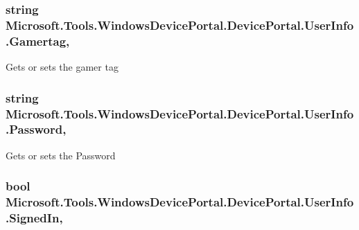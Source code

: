 \subsubsection[{\texorpdfstring{Gamertag}{Gamertag}}]{\setlength{\rightskip}{0pt plus 5cm}string Microsoft.\+Tools.\+Windows\+Device\+Portal.\+Device\+Portal.\+User\+Info.\+Gamertag\hspace{0.3cm}{\ttfamily [get]}, {\ttfamily [set]}}\hypertarget{class_microsoft_1_1_tools_1_1_windows_device_portal_1_1_device_portal_1_1_user_info_ad53d01d610b2f192296449ae0192ad94}{}\label{class_microsoft_1_1_tools_1_1_windows_device_portal_1_1_device_portal_1_1_user_info_ad53d01d610b2f192296449ae0192ad94}


Gets or sets the gamer tag 

\subsubsection[{\texorpdfstring{Password}{Password}}]{\setlength{\rightskip}{0pt plus 5cm}string Microsoft.\+Tools.\+Windows\+Device\+Portal.\+Device\+Portal.\+User\+Info.\+Password\hspace{0.3cm}{\ttfamily [get]}, {\ttfamily [set]}}\hypertarget{class_microsoft_1_1_tools_1_1_windows_device_portal_1_1_device_portal_1_1_user_info_a9211fecccaea4624abad5af1764dafeb}{}\label{class_microsoft_1_1_tools_1_1_windows_device_portal_1_1_device_portal_1_1_user_info_a9211fecccaea4624abad5af1764dafeb}


Gets or sets the Password 

\subsubsection[{\texorpdfstring{Signed\+In}{SignedIn}}]{\setlength{\rightskip}{0pt plus 5cm}bool Microsoft.\+Tools.\+Windows\+Device\+Portal.\+Device\+Portal.\+User\+Info.\+Signed\+In\hspace{0.3cm}{\ttfamily [get]}, {\ttfamily [set]}}\hypertarget{class_microsoft_1_1_tools_1_1_windows_device_portal_1_1_device_portal_1_1_user_info_abfc08ec51962a43b1e8566a93402d5e8}{}\label{class_microsoft_1_1_tools_1_1_windows_device_portal_1_1_device_portal_1_1_user_info_abfc08ec51962a43b1e8566a93402d5e8}


